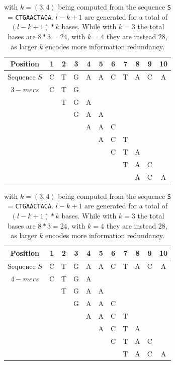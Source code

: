 \begin{table}[h!]
\begin{center}

	\begin{tabular}{ c c c c c c c c c c c}
		\toprule
		Position & 1 & 2 & 3 & 4 & 5 & 6 & 7 & 8 & 9 & 10 \\
		\midrule
		Sequence $S$ & C & T & G & A & A & C & T &A & C & A\\
		\midrule 
		$3-mers$ & C & T & G  \\
		&   & T & G & A \\
		&   &  & G & A & A \\
		&   &  &  & A & A & C\\
		&   &  &  &  & A & C & T\\
		&   &  &  &  &  & C & T & A \\
		&   &  &  &  &  &  & T & A & C \\
		&   &  &  &  &  & & & A & C & A\\
		
		\hline
	\end{tabular}

	\vspace*{0.3 cm}

	\centering
	\begin{tabular}{ c c c c c c c c c c c}
	\toprule
	Position & 1 & 2 & 3 & 4 & 5 & 6 & 7 & 8 & 9 & 10 \\
	\midrule
	Sequence $S$ & C & T & G & A & A & C & T &A & C & A\\
	\midrule 
	$4-mers$ & C & T & G & A \\
	&   & T & G & A & A\\
	&   &  & G & A & A & C\\
	&   &  &  & A & A & C & T\\
	&   &  &  &  & A & C & T & A\\
	&   &  &  &  &  & C & T & A & C\\
	&   &  &  &  &  &  & T & A & C & A\\

	
	\bottomrule
\end{tabular}
	\caption[\kmer computation from a sequence]{\kmers with $k=(3,4)$ being computed from the sequence \texttt{S} = \texttt{CTGAACTACA}. $l-k +1$ \kmers are generated for a total of $(l -k + 1) * k$ bases. While with $k=3$ the total bases are $ 8 * 3 = 24$, with $k=4$ they are instead $28$, as larger $k$ encodes more information redundancy.}
	\label{tab-kmers}
\end{center}
\end{table}


